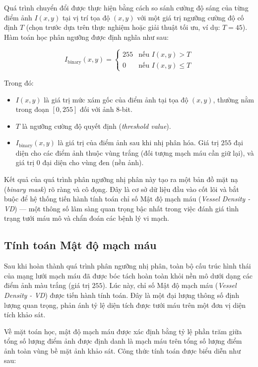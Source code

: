 Quá trình chuyển đổi được thực hiện bằng cách so sánh cường độ sáng của từng điểm ảnh $I(x, y)$ tại vị trí tọa độ $(x, y)$ với một giá trị ngưỡng cường độ cố định $T$ (chọn trước dựa trên thực nghiệm hoặc giải thuật tối ưu, ví dụ: $T = 45$). Hàm toán học phân ngưỡng được định nghĩa như sau:

\begin{equation}
I_{\text{binary}}(x, y) = 
\begin{cases} 
255 & \text{nếu } I(x, y) > T \\ 
0 & \text{nếu } I(x, y) \le T 
\end{cases}
\label{eq:thresholding}
\end{equation}

Trong đó:
\begin{itemize}
    \item $I(x, y)$ là giá trị mức xám gốc của điểm ảnh tại tọa độ $(x, y)$, thường nằm trong đoạn $[0, 255]$ đối với ảnh 8-bit.
    \item $T$ là ngưỡng cường độ quyết định (\textit{threshold value}).
    \item $I_{\text{binary}}(x, y)$ là giá trị của điểm ảnh sau khi nhị phân hóa. Giá trị $255$ đại diện cho các điểm ảnh thuộc vùng trắng (đối tượng mạch máu cần giữ lại), và giá trị $0$ đại diện cho vùng đen (nền ảnh).
\end{itemize}

Kết quả của quá trình phân ngưỡng nhị phân này tạo ra một bản đồ mặt nạ (\textit{binary mask}) rõ ràng và cô đọng. Đây là cơ sở dữ liệu đầu vào cốt lõi và bắt buộc để hệ thống tiến hành tính toán chỉ số Mật độ mạch máu (\textit{Vessel Density - VD}) — một thông số lâm sàng quan trọng bậc nhất trong việc đánh giá tình trạng tưới máu mô và chẩn đoán các bệnh lý vi mạch.


\subsection{Tính toán Mật độ mạch máu}

Sau khi hoàn thành quá trình phân ngưỡng nhị phân, toàn bộ cấu trúc hình thái của mạng lưới mạch máu đã được bóc tách hoàn toàn khỏi nền mô dưới dạng các điểm ảnh màu trắng (giá trị $255$). Lúc này, chỉ số Mật độ mạch máu (\textit{Vessel Density - VD}) được tiến hành tính toán. Đây là một đại lượng thông số định lượng quan trọng, phản ánh tỷ lệ diện tích được tưới máu trên một đơn vị diện tích khảo sát.

Về mặt toán học, mật độ mạch máu được xác định bằng tỷ lệ phần trăm giữa tổng số lượng điểm ảnh được định danh là mạch máu trên tổng số lượng điểm ảnh toàn vùng bề mặt ảnh khảo sát. Công thức tính toán được biểu diễn như sau:


